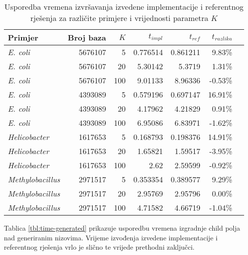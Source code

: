 \documentclass[times, utf8, seminar, numeric]{fer}
\begin{document}
\begin{table}[h]
	\centering
	\caption{Usporedba vremena izvršavanja izvedene implementacije i referentnog rješenja za različite primjere i vrijednosti parametra $K$}
	\label{tbl:time-bacteria}
	
	\begin{tabular}{lrrrrrr}
		\hline
        Primjer & Broj baza & $K$ & $t_{impl}$ & $t_{ref}$ & $t_{razlika}$ \\ \hline
        \textit{E. coli} & 5676107 & 5 & 0.776514 & 0.861211 & 9.83\% \\
        \textit{E. coli} & 5676107 & 20 & 5.30142 & 5.3719 & 1.31\% \\
        \textit{E. coli} & 5676107 & 100 & 9.01133 & 8.96336 & -0.53\% \\ \hline
        \textit{E. coli} & 4393089 & 5 & 0.579196 & 0.697147 & 16.91\% \\
        \textit{E. coli} & 4393089 & 20 & 4.17962 & 4.21829 & 0.91\% \\
        \textit{E. coli} & 4393089 & 100 & 6.95086 & 6.83971 & -1.62\% \\ \hline
        \textit{Helicobacter} & 1617653 & 5 & 0.168793 & 0.198376 & 14.91\% \\
        \textit{Helicobacter} & 1617653 & 20 & 1.65821 & 1.59517 & -3.95\% \\
        \textit{Helicobacter} & 1617653 & 100 & 2.62 & 2.59599 & -0.92\% \\ \hline
        \textit{Methylobacillus} & 2971517 & 5 & 0.353354 & 0.389577 & 9.29\% \\
        \textit{Methylobacillus} & 2971517 & 20 & 2.95769 & 2.95796 & 0.00\% \\
        \textit{Methylobacillus} & 2971517 & 100 & 4.71582 & 4.66719 & -1.04\% \\
    \hline
	\end{tabular}
\end{table}

Tablica \ref{tbl:time-generated} prikazuje usporedbu vremena izgradnje child polja nad generiranim nizovima. Vrijeme izvođenja izvedene implementacije i referentnog rješenja vrlo je slično te vrijede prethodni zaključci.
\end{document}
